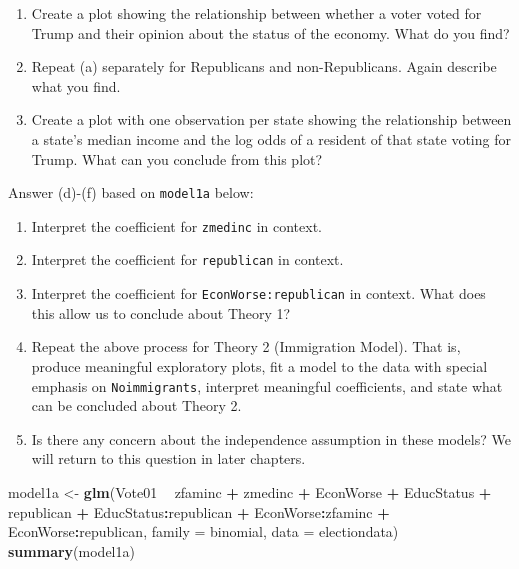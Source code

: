 \documentclass[
]{krantz}
\newenvironment{Shaded}{\begin{snugshade}}{\end{snugshade}}
\newcommand{\DataTypeTok}[1]{\textcolor[rgb]{0.27,0.27,0.27}{#1}}
\newcommand{\KeywordTok}[1]{\textcolor[rgb]{0.27,0.27,0.27}{\textbf{#1}}}
\newcommand{\NormalTok}[1]{#1}
\newcommand{\OperatorTok}[1]{\textcolor[rgb]{0.43,0.43,0.43}{\textbf{#1}}}
\newcommand{\StringTok}[1]{\textcolor[rgb]{0.5,0.5,0.5}{#1}}
\providecommand{\tightlist}{%
  \setlength{\itemsep}{0pt}\setlength{\parskip}{0pt}}
\begin{document}
\begin{enumerate}
  \begin{enumerate}
  \def\labelenumii{\alph{enumii}.}
  \tightlist
  \item
    Create a plot showing the relationship between whether a voter voted for Trump and their opinion about the status of the economy. What do you find?
  \item
    Repeat (a) separately for Republicans and non-Republicans. Again describe what you find.
  \item
    Create a plot with one observation per state showing the relationship between a state's median income and the log odds of a resident of that state voting for Trump. What can you conclude from this plot?
  \end{enumerate}

  Answer (d)-(f) based on \texttt{model1a} below:

  \begin{enumerate}
  \def\labelenumii{\alph{enumii}.}
  \setcounter{enumii}{3}
  \tightlist
  \item
    Interpret the coefficient for \texttt{zmedinc} in context.
  \item
    Interpret the coefficient for \texttt{republican} in context.
  \item
    Interpret the coefficient for \texttt{EconWorse:republican} in context. What does this allow us to conclude about Theory 1?\\
  \item
    Repeat the above process for Theory 2 (Immigration Model). That is, produce meaningful exploratory plots, fit a model to the data with special emphasis on \texttt{Noimmigrants}, interpret meaningful coefficients, and state what can be concluded about Theory 2.
  \item
    Is there any concern about the independence assumption in these models? We will return to this question in later chapters.
  \end{enumerate}
\end{enumerate}

\begin{Shaded}
\begin{Highlighting}[]
\NormalTok{model1a <-}\StringTok{ }\KeywordTok{glm}\NormalTok{(Vote01 }\OperatorTok{~}\StringTok{ }\NormalTok{zfaminc }\OperatorTok{+}\StringTok{ }\NormalTok{zmedinc }\OperatorTok{+}\StringTok{ }\NormalTok{EconWorse }\OperatorTok{+}
\StringTok{    }\NormalTok{EducStatus }\OperatorTok{+}\StringTok{ }\NormalTok{republican }\OperatorTok{+}\StringTok{ }\NormalTok{EducStatus}\OperatorTok{:}\NormalTok{republican }\OperatorTok{+}
\StringTok{    }\NormalTok{EconWorse}\OperatorTok{:}\NormalTok{zfaminc }\OperatorTok{+}\StringTok{ }\NormalTok{EconWorse}\OperatorTok{:}\NormalTok{republican, }
    \DataTypeTok{family =}\NormalTok{ binomial, }\DataTypeTok{data =}\NormalTok{ electiondata)}
\KeywordTok{summary}\NormalTok{(model1a)}
\end{Highlighting}
\end{Shaded}
\end{document}

